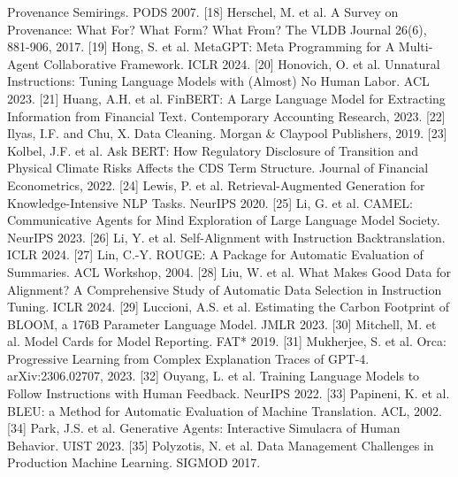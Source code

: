 \documentclass[9pt,twocolumn]{extarticle}
\begin{document}
Provenance Semirings. PODS 2007.
\protect{}\label{ref_18}{}[18] Herschel, M. et al. A
Survey on Provenance: What For? What Form? What From? The VLDB Journal
26(6), 881-906, 2017.
\protect{}\label{ref_19}{}[19] Hong, S. et al. MetaGPT:
Meta Programming for A Multi-Agent Collaborative Framework. ICLR 2024.
\protect{}\label{ref_20}{}[20] Honovich, O. et al.
Unnatural Instructions: Tuning Language Models with (Almost) No Human
Labor. ACL 2023.
\protect{}\label{ref_21}{}[21] Huang, A.H. et al.
FinBERT: A Large Language Model for Extracting Information from
Financial Text. Contemporary Accounting Research, 2023.
\protect{}\label{ref_22}{}[22] Ilyas, I.F. and Chu, X.
Data Cleaning. Morgan \& Claypool Publishers, 2019.
\protect{}\label{ref_23}{}[23] Kolbel, J.F. et al. Ask
BERT: How Regulatory Disclosure of Transition and Physical Climate Risks
Affects the CDS Term Structure. Journal of Financial Econometrics, 2022.
\protect{}\label{ref_24}{}[24] Lewis, P. et al.
Retrieval-Augmented Generation for Knowledge-Intensive NLP Tasks.
NeurIPS 2020.
\protect{}\label{ref_25}{}[25] Li, G. et al. CAMEL:
Communicative Agents for Mind Exploration of Large Language Model
Society. NeurIPS 2023.
\protect{}\label{ref_26}{}[26] Li, Y. et al.
Self-Alignment with Instruction Backtranslation. ICLR 2024.
[27] Lin, C.-Y. ROUGE: A Package for Automatic Evaluation of
Summaries. ACL Workshop, 2004.
\protect{}\label{ref_28}{}[28] Liu, W. et al. What
Makes Good Data for Alignment? A Comprehensive Study of Automatic Data
Selection in Instruction Tuning. ICLR 2024.
\protect{}\label{ref_29}{}[29] Luccioni, A.S. et al.
Estimating the Carbon Footprint of BLOOM, a 176B Parameter Language
Model. JMLR 2023.
\protect{}\label{ref_30}{}[30] Mitchell, M. et al.
Model Cards for Model Reporting. FAT* 2019.
\protect{}\label{ref_31}{}[31] Mukherjee, S. et al.
Orca: Progressive Learning from Complex Explanation Traces of GPT-4.
arXiv:2306.02707, 2023.
\protect{}\label{ref_32}{}[32] Ouyang, L. et al.
Training Language Models to Follow Instructions with Human Feedback.
NeurIPS 2022.
[33] Papineni, K. et al. BLEU: a Method for Automatic Evaluation of
Machine Translation. ACL, 2002.
\protect{}\label{ref_34}{}[34] Park, J.S. et al.
Generative Agents: Interactive Simulacra of Human Behavior. UIST 2023.
\protect{}\label{ref_35}{}[35] Polyzotis, N. et al.
Data Management Challenges in Production Machine Learning. SIGMOD 2017.
\end{document}
